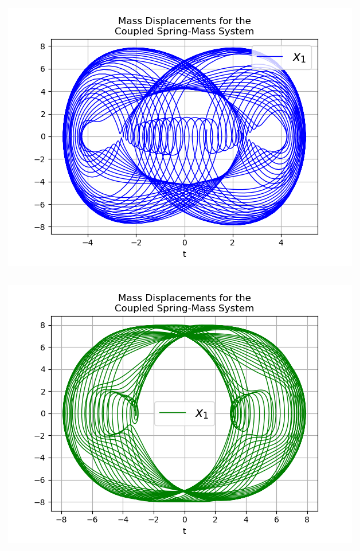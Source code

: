 \documentclass{article}
\begin{document}
\begin{figure}[h!]
  \centering
  \begin{subfigure}[b]{0.45\linewidth}
    \includegraphics[width=\linewidth]{two_springs331.png}
    \caption{}
  \end{subfigure}
  \begin{subfigure}[b]{0.45\linewidth}
    \includegraphics[width=\linewidth]{two_springs332.png}
    \caption{}
  \end{subfigure}
  \begin{subfigure}[b]{0.5\linewidth}

\end{subfigure}
\end{figure}
\end{document}
